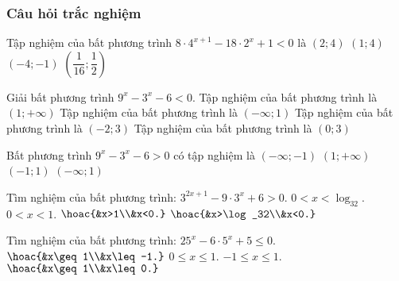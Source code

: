 \subsubsection{Câu hỏi trắc nghiệm}
\begin{ex}%
	Tập nghiệm của bất phương trình $8\cdot4^{x+1}-18\cdot 2^x+1<0$ là 
	\choice
	{$(2;4)$}
	{$(1;4)$}
	{\True $(-4;-1)$}
	{$\left(\dfrac{1}{16};\dfrac{1}{2}\right)$}
\end{ex}
\begin{ex}%
	Giải bất phương trình $9^x-3^x-6<0$. 
	\choice
	{Tập nghiệm của bất phương trình là $(1;+\infty)$}
	{\True Tập nghiệm của bất phương trình là $(-\infty;1)$}
	{Tập nghiệm của bất phương trình là $(-2;3)$}
	{Tập nghiệm của bất phương trình là $(0;3)$}
\end{ex}
\begin{ex}%
	Bất phương trình $9^x-3^x-6>0$ có tập nghiệm là
	\choice
	{$(-\infty;-1)$}
	{\True $(1;+\infty)$}
	{$(-1;1)$}
	{$(-\infty;1)$}
\end{ex}
\begin{ex}%
	Tìm nghiệm của bất phương trình: $3^{2x+1}-9\cdot 3^x+6>0$. 
	\def\dotEX{}
	\choice
	{$0<x<\log_32$.}
	{$0<x<1$.}
	{$\hoac{&x>1\\&x<0.}$}
	{\True $\hoac{&x>\log_32\\&x<0.}$}
\end{ex}
\begin{ex}%
	Tìm nghiệm của bất phương trình: $25^x-6\cdot 5^x+5\leq 0$.
	\def\dotEX{}
	\choice
	{$\hoac{&x\geq 1\\&x\leq-1.}$}
	{\True $0\leq x\leq 1.$}
	{$-1\leq x\leq 1$.}
	{$\hoac{&x\geq 1\\&x\leq 0.}$}
\end{ex}
